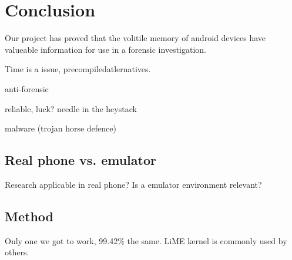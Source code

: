\section{Conclusion}
Our project has proved that the volitile memory of android devices have valueable information for use in a forensic investigation.

Time is a issue, precompiled\hardware atlernatives.

anti-forensic

reliable, luck? needle in the heystack

malware (trojan horse defence)


\subsection{Real phone vs. emulator}
Research applicable in real phone? Is a emulator environment relevant?


\subsection{Method}
Only one we got to work, 99.42\% the same.
LiME kernel is commonly used by others.



